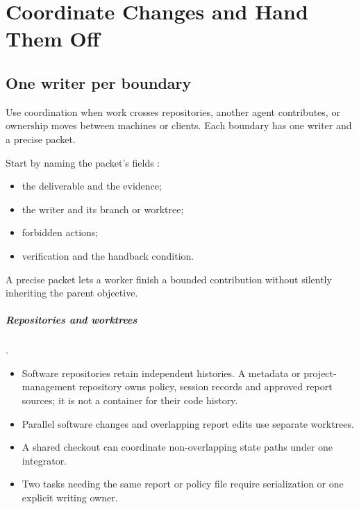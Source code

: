 \chapter{Coordinate Changes and Hand Them Off}\label{ch:handoff}
\section{One writer per boundary}

\begin{headline}
  Use coordination when work crosses repositories, another agent contributes, or ownership
  moves between machines or clients. Each boundary has one writer and a precise packet.
\end{headline}

Start by naming the packet's fields \cite[Dispatch packet; Review]{skill:delegation}:
\begin{itemize}
  \item the deliverable and the evidence;
  \item the writer and its branch or worktree;
  \item forbidden actions;
  \item verification and the handback condition.
\end{itemize}
A precise packet lets a worker finish a bounded contribution without silently inheriting
the parent objective.

\paragraph{Repositories and worktrees} \cite[Start a writing task; Commit and hand
  off]{skill:git}.
\begin{itemize}
  \item Software repositories retain independent histories. A metadata or project-management
        repository owns policy, session records and approved report sources; it is not a
        container for their code history.
  \item Parallel software changes and overlapping report edits use separate worktrees.
  \item A shared checkout can coordinate non-overlapping state paths under one integrator.
  \item Two tasks needing the same report or policy file require serialization or one explicit
        writing owner.
\end{itemize}

